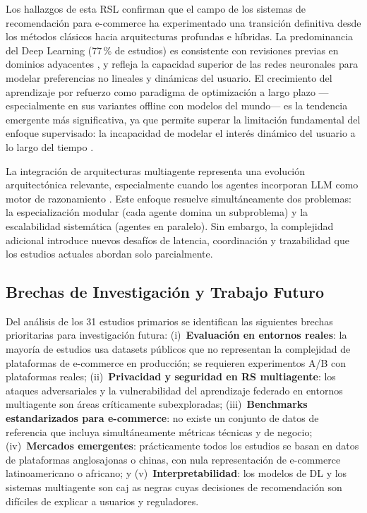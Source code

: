 \documentclass[12pt, a4paper]{article}
\begin{document}
Los hallazgos de esta RSL confirman que el campo de los sistemas de
recomendaci\'on para e-commerce ha experimentado una transici\'on definitiva
desde los m\'etodos cl\'asicos hacia arquitecturas profundas e h\'ibridas. La
predominancia del Deep Learning (77\,\% de estudios) es consistente con
revisiones previas en dominios adyacentes \cite{Lampa2024}, y refleja la
capacidad superior de las redes neuronales para modelar preferencias no lineales
y din\'amicas del usuario. El crecimiento del aprendizaje por refuerzo como
paradigma de optimizaci\'on a largo plazo ---especialmente en sus variantes
offline con modelos del mundo--- es la tendencia emergente m\'as significativa,
ya que permite superar la limitaci\'on fundamental del enfoque supervisado: la
incapacidad de modelar el inter\'es din\'amico del usuario a lo largo del tiempo
\cite{Zhang2025DARLR}.

La integraci\'on de arquitecturas multiagente representa una evoluci\'on
arquitect\'onica relevante, especialmente cuando los agentes incorporan LLM
como motor de razonamiento \cite{Bai2025, Ho2025GraphMind}. Este enfoque
resuelve simult\'aneamente dos problemas: la especializaci\'on modular (cada
agente domina un subproblema) y la escalabilidad sistem\'atica (agentes en
paralelo). Sin embargo, la complejidad adicional introduce nuevos desaf\'ios
de latencia, coordinaci\'on y trazabilidad que los estudios actuales abordan
solo parcialmente.

\subsection{Brechas de Investigaci\'on y Trabajo Futuro}

Del an\'alisis de los 31 estudios primarios se identifican las siguientes brechas
prioritarias para investigaci\'on futura: (i)~\textbf{Evaluaci\'on en entornos
reales}: la mayor\'ia de estudios usa datasets p\'ublicos que no representan la
complejidad de plataformas de e-commerce en producci\'on; se requieren
experimentos A/B con plataformas reales; (ii)~\textbf{Privacidad y seguridad
en RS multiagente}: los ataques adversariales \cite{Liu2025backdoor} y la
vulnerabilidad del aprendizaje federado en entornos multiagente son \'areas
cr\'iticamente subexploradas; (iii)~\textbf{Benchmarks estandarizados para
e-commerce}: no existe un conjunto de datos de referencia que incluya
simult\'aneamente m\'etricas t\'ecnicas y de negocio; (iv)~\textbf{Mercados
emergentes}: pr\'acticamente todos los estudios se basan en datos de plataformas
anglosajonas o chinas, con nula representaci\'on de e-commerce latinoamericano
o africano; y (v)~\textbf{Interpretabilidad}: los modelos de DL y los sistemas
multiagente son caj as negras cuyas decisiones de recomendaci\'on son dif\'iciles
de explicar a usuarios y reguladores.
\end{document}
